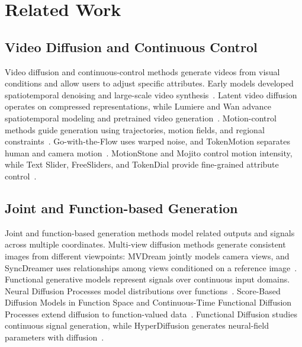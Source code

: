 
\section{Related Work}
\label{sec:related_work}

\subsection{Video Diffusion and Continuous Control}
Video diffusion and continuous-control methods generate videos from
visual conditions and allow users to adjust specific attributes.
Early models developed spatiotemporal denoising and large-scale video
synthesis~\cite{ho2022video,singer2022make,ho2022imagen}.
Latent video diffusion operates on compressed representations, while
Lumiere and Wan advance spatiotemporal modeling and pretrained video
generation~\cite{blattmann2023align,bar2024lumiere,wan2025}.
Motion-control methods guide generation using trajectories, motion
fields, and regional constraints~\cite{yin2023dragnuwa,shi2024motioni2v,
geng2025motionprompting,zhang2025motionpro}.
Go-with-the-Flow uses warped noise, and TokenMotion separates human
and camera motion~\cite{burgert2025gowiththeflow,li2025tokenmotion}.
MotionStone and Mojito control motion intensity, while Text Slider,
FreeSliders, and TokenDial provide fine-grained attribute
control~\cite{shi2025motionstone,he2024mojito,chiu2025textslider,
ezra2025freesliders,liu2026tokendial}.

\subsection{Joint and Function-based Generation}
Joint and function-based generation methods model related outputs
and signals across multiple coordinates.
Multi-view diffusion methods generate consistent images from different
viewpoints: MVDream jointly models camera views, and SyncDreamer uses
relationships among views conditioned on a reference
image~\cite{shi2024mvdream,liu2024syncdreamer}.
Functional generative models represent signals over continuous input
domains. Neural Diffusion Processes model distributions over
functions~\cite{dutordoir2022neural}.
Score-Based Diffusion Models in Function Space and Continuous-Time
Functional Diffusion Processes extend diffusion to function-valued
data~\cite{lim2023score,franzese2023continuous}.
Functional Diffusion studies continuous signal generation, while
HyperDiffusion generates neural-field parameters with
diffusion~\cite{zhang2023functional,erkoc2023hyperdiffusion}.


